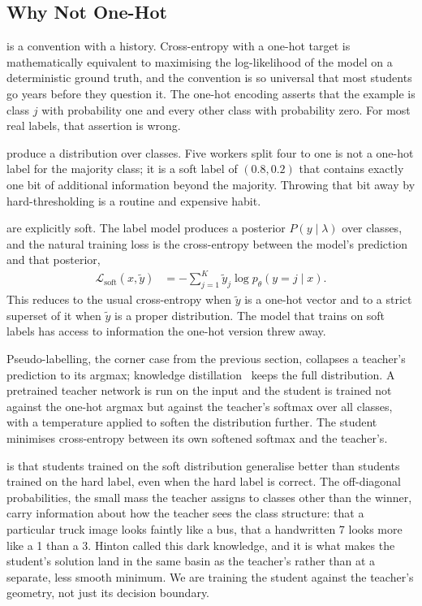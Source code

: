 \subsection{Why Not One-Hot}

 is a convention with a history. Cross-entropy with a one-hot target is mathematically equivalent to maximising the log-likelihood of the model on a deterministic ground truth, and the convention is so universal that most students go years before they question it. The one-hot encoding asserts that the example is class $j$ with probability one and every other class with probability zero. For most real labels, that assertion is wrong.

 produce a distribution over classes. Five workers split four to one is not a one-hot label for the majority class; it is a soft label of $(0.8, 0.2)$ that contains exactly one bit of additional information beyond the majority. Throwing that bit away by hard-thresholding is a routine and expensive habit.

 are explicitly soft. The label model produces a posterior $P(y \mid \lambda)$ over classes, and the natural training loss is the cross-entropy between the model's prediction and that posterior,
\begin{align*}
    \mathcal{L}_{\text{soft}}(x, \tilde y) &= -\sum_{j=1}^K \tilde y_j \log p_\theta(y = j \mid x).
\end{align*}
This reduces to the usual cross-entropy when $\tilde y$ is a one-hot vector and to a strict superset of it when $\tilde y$ is a proper distribution. The model that trains on soft labels has access to information the one-hot version threw away.

 Pseudo-labelling, the corner case from the previous section, collapses a teacher's prediction to its argmax; knowledge distillation~\cite{HintonDistillation2015} keeps the full distribution. A pretrained teacher network is run on the input and the student is trained not against the one-hot argmax but against the teacher's softmax over all classes, with a temperature applied to soften the distribution further. The student minimises cross-entropy between its own softened softmax and the teacher's.

 is that students trained on the soft distribution generalise better than students trained on the hard label, even when the hard label is correct. The off-diagonal probabilities, the small mass the teacher assigns to classes other than the winner, carry information about how the teacher sees the class structure: that a particular truck image looks faintly like a bus, that a handwritten 7 looks more like a 1 than a 3. Hinton called this dark knowledge, and it is what makes the student's solution land in the same basin as the teacher's rather than at a separate, less smooth minimum. We are training the student against the teacher's geometry, not just its decision boundary.

